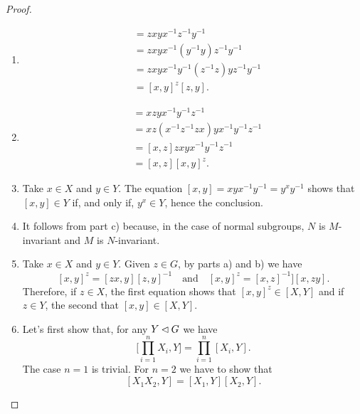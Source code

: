 \begin{proof}${}$
\begin{enumerate}[\rm a)]
    \item 
    \begin{align*}
        [zx,y] &= zxyx^{-1}z^{-1}y^{-1}\\
            &= zxyx^{-1}(y^{-1}y)z^{-1}y^{-1}\\
            &= zxyx^{-1}y^{-1}(z^{-1}z)yz^{-1}y^{-1}\\
            &= [x,y]^z[z,y].
    \end{align*}

    \item
    \begin{align*}
        [x,zy] &= xzyx^{-1}y^{-1}z^{-1}\\
            &= xz(x^{-1}z^{-1}zx)yx^{-1}y^{-1}z^{-1}\\
            &= [x,z]zxyx^{-1}y^{-1}z^{-1}\\
            &= [x,z][x,y]^z.
    \end{align*}

    \item Take $x\in X$ and $y\in Y$. The equation $[x,y]=xyx^{-1}y^{-1}=y^xy^{-1}$ shows that $[x,y]\in Y$ if, and only if, $y^x\in Y$, hence the conclusion.

    \item It follows from part c) because, in the case of normal subgroups, $N$ is $M$-invariant and $M$ is $N$-invariant.
    
    \item Take $x\in X$ and $y\in Y$. Given $z\in G$, by parts a) and b) we have
    $$
        [x,y]^z=[zx,y][z,y]^{-1}\quad\text{and}\quad [x,y]^z=[x,z]^{-1}][x,zy].
    $$
    Therefore, if $z\in X$, the first equation shows that $[x,y]^z\in [X,Y]$ and if $z\in Y$, the second that $[x,y]\in[X,Y]$.

    \item Let's first show that, for any $Y\lhd G$ we have
    $$
        \Big[\prod_{i=1}^nX_i,Y\Big]=\prod_{i=1}^n[X_i,Y].
    $$
    The case $n=1$ is trivial. For $n=2$ we have to show that
    \begin{equation}\label{eq.f}
        [X_1X_2,Y] = [X_1,Y][X_2,Y].
    \end{equation}


\end{enumerate}
\end{proof}
